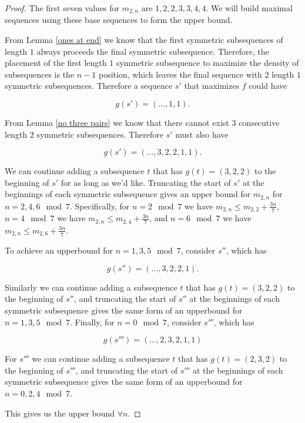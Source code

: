 \documentclass[12pt]{article}
\theoremstyle{plain}
\theoremstyle{definition}
\theoremstyle{remark}
\theoremstyle{definition}
\begin{document}
\begin{proof}
    The first seven values for $m_{2,n}$ are $1,2,2,3,3,4,4$. We will build maximal sequences using these base sequences to form the upper bound. 
    
    From Lemma \ref{ones at end} we know that the first symmetric subsequences of length $1$ always proceeds the final symmetric subsequence. Therefore, the placement of the first length $1$ symmetric subsequence to maximize the density of subsequences is the $n-1$ position, which leaves the final sequence with $2$ length $1$ symmetric subsequences. Therefore a sequence $s'$ that maximizes $f$ could have

    $$g(s') = (\dots,1,1).$$

    From Lemma \ref{no three pairs} we know that there cannot exist $3$ consecutive length $2$ symmetric subsequences. Therefore $s'$ must also have

    $$g(s') = (\dots,3,2,2,1,1).$$

    We can continue adding a subsequence $t$ that has $g(t)=(3,2,2)$ to the beginning of $s'$ for as long as we'd like. Truncating the start of $s'$ at the beginnings of each symmetric subsequence gives an upper bound for $m_{2,n}$ for $n=2,4,6 \mod 7$. Specifically, for $n=2 \mod 7$ we have $m_{2,n} \leq m_{2,2} + \frac{3n}{7}$, $n=4 \mod 7$ we have $m_{2,n} \leq m_{2,4} + \frac{3n}{7}$, and $n=6 \mod 7$ we have $m_{2,n} \leq m_{2,6} + \frac{3n}{7}$.

    To achieve an upperbound for $n=1,3,5 \mod 7$, consider $s''$, which has

    $$g(s'') = (\dots, 3,2,2,1).$$

    Similarly we can continue adding a subsequence $t$ that has $g(t)=(3,2,2)$ to the beginning of $s''$, and truncating the start of $s''$ at the beginnings of each symmetric subsequence gives the same form of an upperbound for $n=1,3,5 \mod 7$. Finally, for $n=0 \mod 7$, consider $s'''$, which has

    $$g(s''') = (\dots,2,3,2,1,1)$$

    For $s'''$ we can continue adding a subsequence $t$ that has $g(t)=(2,3,2)$ to the beginning of $s'''$, and truncating the start of $s'''$ at the beginnings of each symmetric subsequence gives the same form of an upperbound for $n=0,2,4 \mod 7$.

    This gives us the upper bound $\forall n$.
    
\end{proof}
\end{document}
